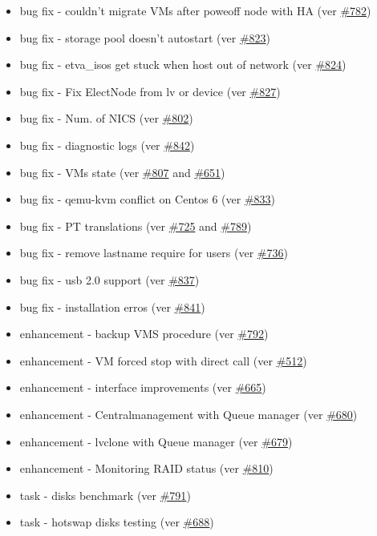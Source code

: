 \begin{itemize}
	\item bug fix - couldn't migrate VMs after poweoff node with HA (ver \href{https://srcmaster.eurotux.com/pm/p/etva/ticket/782}{\#782})
	\item bug fix - storage pool doesn't autostart (ver \href{https://srcmaster.eurotux.com/pm/p/etva/ticket/823}{\#823})
	\item bug fix - etva\_isos get stuck when host out of network (ver \href{https://srcmaster.eurotux.com/pm/p/etva/ticket/824}{\#824})
	\item bug fix - Fix ElectNode from lv or device (ver \href{https://srcmaster.eurotux.com/pm/p/etva/ticket/827}{\#827})
	\item bug fix - Num. of NICS (ver \href{https://srcmaster.eurotux.com/pm/p/etva/ticket/802}{\#802})
	\item bug fix - diagnostic logs (ver \href{https://srcmaster.eurotux.com/pm/p/etva/ticket/842}{\#842})
	\item bug fix - VMs state (ver \href{https://srcmaster.eurotux.com/pm/p/etva/ticket/807}{\#807} and \href{https://srcmaster.eurotux.com/pm/p/etva/ticket/651}{\#651})
	\item bug fix - qemu-kvm conflict on Centos 6 (ver \href{https://srcmaster.eurotux.com/pm/p/etva/ticket/833}{\#833})
	\item bug fix - PT translations (ver \href{https://srcmaster.eurotux.com/pm/p/etva/ticket/725}{\#725} and \href{https://srcmaster.eurotux.com/pm/p/etva/ticket/789}{\#789})
	\item bug fix - remove lastname require for users (ver \href{https://srcmaster.eurotux.com/pm/p/etva/ticket/736}{\#736})
	\item bug fix - usb 2.0 support (ver \href{https://srcmaster.eurotux.com/pm/p/etva/ticket/837}{\#837})
	\item bug fix - installation erros (ver \href{https://srcmaster.eurotux.com/pm/p/etva/ticket/841}{\#841})
	\item enhancement - backup VMS procedure (ver \href{https://srcmaster.eurotux.com/pm/p/etva/ticket/792}{\#792})
	\item enhancement - VM forced stop with direct call (ver \href{https://srcmaster.eurotux.com/pm/p/etva/ticket/512}{\#512})
	\item enhancement - interface improvements (ver \href{https://srcmaster.eurotux.com/pm/p/etva/ticket/665}{\#665})
	\item enhancement - Centralmanagement with Queue manager (ver \href{https://srcmaster.eurotux.com/pm/p/etva/ticket/680}{\#680})
	\item enhancement - lvclone with Queue manager (ver \href{https://srcmaster.eurotux.com/pm/p/etva/ticket/679}{\#679})
	\item enhancement - Monitoring RAID status (ver \href{https://srcmaster.eurotux.com/pm/p/etva/ticket/810}{\#810})
	\item task - disks benchmark (ver \href{https://srcmaster.eurotux.com/pm/p/etva/ticket/791}{\#791})
	\item task - hotswap disks testing (ver \href{https://srcmaster.eurotux.com/pm/p/etva/ticket/688}{\#688})
\end{itemize}

